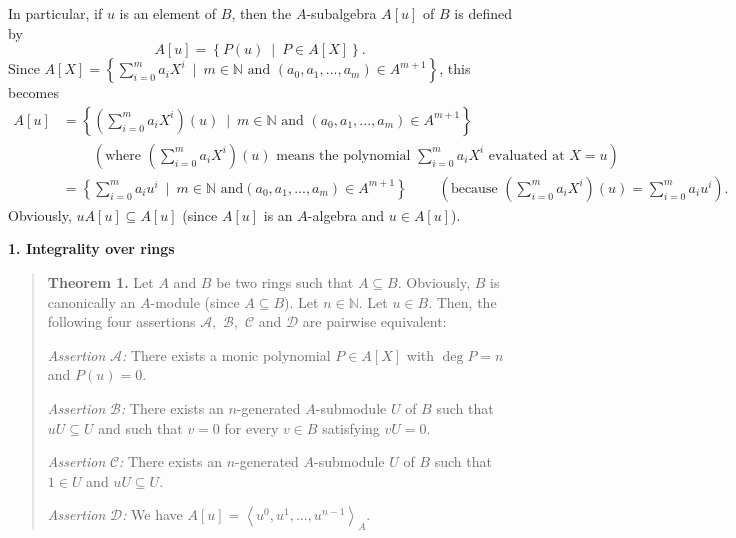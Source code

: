 \documentclass[12pt,final,notitlepage,onecolumn]{article}%
\begin{document}
In particular, if $u$ is an element of $B$, then the $A$-subalgebra $A\left[
u\right]  $ of $B$ is defined by%
\[
A\left[  u\right]  =\left\{  P\left(  u\right)  \ \mid\ P\in A\left[
X\right]  \right\}  .
\]
Since $A\left[  X\right]  =\left\{  \sum\limits_{i=0}^{m}a_{i}X^{i}%
\ \mid\ m\in\mathbb{N}\text{ and }\left(  a_{0},a_{1},...,a_{m}\right)  \in
A^{m+1}\right\}  $, this becomes
\begin{align*}
A\left[  u\right]   &  =\left\{  \left(  \sum\limits_{i=0}^{m}a_{i}%
X^{i}\right)  \left(  u\right)  \ \mid\ m\in\mathbb{N}\text{ and }\left(
a_{0},a_{1},...,a_{m}\right)  \in A^{m+1}\right\} \\
&  \ \ \ \ \ \ \ \ \ \ \left(  \text{where }\left(  \sum\limits_{i=0}^{m}%
a_{i}X^{i}\right)  \left(  u\right)  \text{ means the polynomial }%
\sum\limits_{i=0}^{m}a_{i}X^{i}\text{ evaluated at }X=u\right) \\
&  =\left\{  \sum\limits_{i=0}^{m}a_{i}u^{i}\ \mid\ m\in\mathbb{N}\text{ and
}\left(  a_{0},a_{1},...,a_{m}\right)  \in A^{m+1}\right\}
\ \ \ \ \ \ \ \ \ \ \left(  \text{because }\left(  \sum\limits_{i=0}^{m}%
a_{i}X^{i}\right)  \left(  u\right)  =\sum\limits_{i=0}^{m}a_{i}u^{i}\right)
.
\end{align*}
Obviously, $uA\left[  u\right]  \subseteq A\left[  u\right]  $ (since
$A\left[  u\right]  $ is an $A$-algebra and $u\in A\left[  u\right]  $).

\begin{center}
\color{blue} \textbf{1. Integrality over rings} \color{black}
\end{center}

\begin{quote}
\textbf{Theorem 1.} Let $A$ and $B$ be two rings such that $A\subseteq B$.
Obviously, $B$ is canonically an $A$-module (since $A\subseteq B$). Let
$n\in\mathbb{N}$. Let $u\in B$. Then, the following four assertions
$\mathcal{A},$ $\mathcal{B},$ $\mathcal{C}$ and $\mathcal{D}$ are pairwise equivalent:

\textit{Assertion }$\mathcal{A}$\textit{:} There exists a monic polynomial
$P\in A\left[  X\right]  $ with $\deg P=n$ and $P\left(  u\right)  =0$.

\textit{Assertion }$\mathcal{B}$\textit{:} There exists an $n$-generated
$A$-submodule $U$ of $B$ such that $uU\subseteq U$ and such that $v=0$ for
every $v\in B$ satisfying $vU=0$.

\textit{Assertion }$\mathcal{C}$\textit{:} There exists an $n$-generated
$A$-submodule $U$ of $B$ such that $1\in U$ and $uU\subseteq U$.

\textit{Assertion }$\mathcal{D}$\textit{:} We have $A\left[  u\right]
=\left\langle u^{0},u^{1},...,u^{n-1}\right\rangle _{A}$.
\end{quote}
\end{document}

